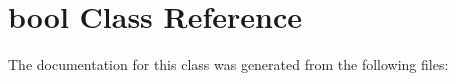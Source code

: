\hypertarget{classbool}{}\section{bool Class Reference}
\label{classbool}


The documentation for this class was generated from the following files\+: